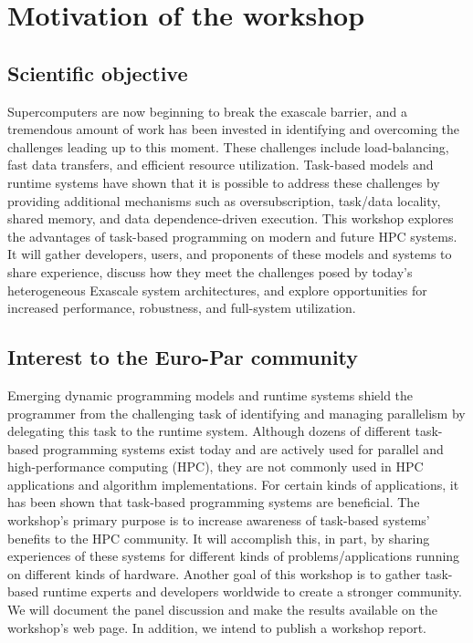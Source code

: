 \documentclass{article}
\begin{document}
\section*{Motivation of the workshop}

\subsection*{Scientific objective}

Supercomputers are now beginning to break the exascale barrier, and a tremendous amount of work has been invested in identifying and overcoming the challenges leading up to this moment. These challenges include load-balancing, fast data transfers, and efficient resource utilization.  Task-based models and runtime systems have shown that it is possible to address these challenges by providing additional mechanisms such as oversubscription, task/data locality, shared memory, and data dependence-driven execution. 
This workshop explores the advantages of task-based programming on modern and future  HPC systems. It will gather developers, users, and proponents of these models and systems to share experience, discuss how they meet the challenges posed by today's heterogeneous Exascale system architectures, and explore opportunities for increased performance, robustness, and full-system utilization.

\subsection*{Interest to the Euro-Par community}

Emerging dynamic programming models and runtime systems shield the programmer from the challenging task of identifying and managing parallelism by delegating this task to the runtime system. Although dozens of different task-based programming systems exist today and are actively used for parallel and high-performance computing (HPC), they are not commonly used in HPC applications and algorithm implementations. For certain kinds of applications, it has been shown that task-based programming systems are beneficial. 
The workshop's primary purpose is to increase awareness of task-based systems' benefits to the HPC community. 
It will accomplish this, in part, by sharing experiences of these systems for different kinds of problems/applications running on different kinds of hardware. Another goal of this workshop is to gather task-based runtime experts and developers worldwide to create a stronger community. 
We will document the panel discussion and make the results available on the workshop’s web page. In addition, we intend to publish a workshop report.
\end{document}
